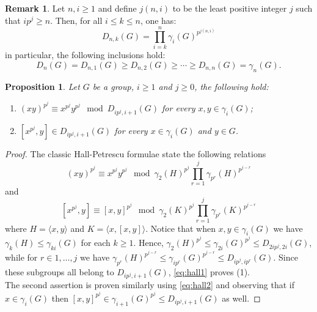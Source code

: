 \documentclass{amsart}
\theoremstyle{plain}
\newtheorem{prop}{Proposition}
\theoremstyle{definition}
\newtheorem{remark}{Remark}
\numberwithin{theorem}{section}
\numberwithin{equation}{section}
\begin{document}
\begin{remark}\label{rem:explicit.filtration}
    Let $n, i \geq 1$ and define $j(n, i)$ to be the least positive integer $j$ such that $ip^{j} \geq n$. Then, for all $i \leq k \leq n$, one has:
    \begin{equation}                        D_{n, k}(G) = \prod_{i=k}^n \gamma_i(G)^{p^{j(n, i)}} %
    \end{equation}
    in particular, the following inclusions hold:
    \[
        D_n(G) = D_{n, 1}(G) \geq D_{n, 2}(G) \geq \cdots \geq D_{n, n}(G) = \gamma_n(G).
    \] 
\end{remark}

\begin{prop}\label{prop:hall}
    Let $G$ be a group, $i \geq 1$ and $j \geq 0$, the following hold:
    \begin{enumerate}
        \item $(xy)^{p^j} \equiv x^{p^j} y^{p^j} \mod D_{ip^j, i+1}(G)$ for every $x, y \in \gamma_i(G)$;
        \item $[x^{p^j}, y] \in D_{ip^j, i+1}(G)$ for every $x \in \gamma_i(G)$ and $y \in G$.
    \end{enumerate}
\end{prop}
\begin{proof}
    The classic Hall-Petrescu formulae \cite[I, §3 9.4]{Hup67} state the following relations
    \begin{equation}\label{eq:hall1}
        (xy)^{p^j} \equiv x^{p^j} y^{p^j} \mod \gamma_2(H)^{p^j} \prod_{r=1}^j \gamma_{p^r}(H)^{p^{j-r}}
    \end{equation}
    and 
    \begin{equation}\label{eq:hall2}
        [x^{p^j}, y] \equiv [x, y]^{p^j} \mod \gamma_2(K)^{p^j} \prod_{r=1}^j \gamma_{p^r}(K)^{p^{j-r}}
    \end{equation}
    where $H = \langle x, y \rangle$ and $K = \langle x, [x, y] \rangle$. Notice that when $x, y \in \gamma_i(G)$ we have  $\gamma_k(H) \leq \gamma_{ki}(G)$ for each $k\ge 1$. Hence, $\gamma_2(H)^{p^j} \leq \gamma_{2i}(G)^{p^j} \leq D_{2ip^j,2i}(G)$, while for $r \in{1, \dots, j}$ we have $\gamma_{p^r}(H)^{p^{j-r}} \leq \gamma_{ip^r}(G)^{p^{j-r}}\leq D_{ip^j,ip^r}(G)$.  Since these subgroups all belong to $D_{ip^j, i+1}(G)$, \eqref{eq:hall1} proves (1). \medskip \\
    The second assertion is proven similarly using \eqref{eq:hall2} and observing that if $x \in \gamma_i(G)$ then $[x, y]^{p^j} \in \gamma_{i+1}(G)^{p^j} \leq D_{ip^j, i+1}(G)$ as well.
\end{proof}
\end{document}
